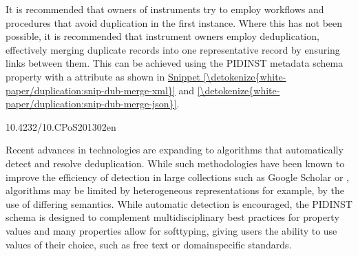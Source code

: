 \documentclass[a4paper,10pt,english]{sphinxmanual}
\begin{document}
\sphinxAtStartPar
It is recommended that owners of instruments try to employ workflows
and procedures that avoid duplication in the first instance.  Where
this has not been possible, it is recommended that instrument owners
employ deduplication, effectively merging duplicate records into one
representative record by ensuring links between them.  This can be
achieved using the PIDINST metadata schema 
property with a  attribute  as shown in
\hyperref[\detokenize{white-paper/duplication:snip-dub-merge-xml}]{Snippet \ref{\detokenize{white-paper/duplication:snip-dub-merge-xml}}} and \hyperref[\detokenize{white-paper/duplication:snip-dub-merge-json}]{\ref{\detokenize{white-paper/duplication:snip-dub-merge-json}}}.
\def\sphinxLiteralBlockLabel{\label{\detokenize{white-paper/duplication:snip-dub-merge-xml}}}
\begin{sphinxVerbatim}[commandchars=\\\{\}]
       10.4232/10.CPoS\PYGZhy{}2013\PYGZhy{}02en
\end{sphinxVerbatim}
\def\sphinxLiteralBlockLabel{\label{\detokenize{white-paper/duplication:snip-dub-merge-json}}}
\begin{sphinxVerbatim}[commandchars=\\\{\}]
\PYG{p}{[}
     
\PYG{p}{]}
\end{sphinxVerbatim}

\sphinxAtStartPar
Recent advances in technologies are expanding to algorithms that
automatically detect and resolve deduplication.  While such
methodologies have been known to improve the efficiency of detection
in large collections such as Google Scholar or ,
algorithms may be limited by heterogeneous representations for
example, by the use of differing semantics.  While automatic detection
is encouraged, the PIDINST schema is designed to complement
multidisciplinary best practices for property values and many
properties allow for soft\sphinxhyphen{}typing, giving users the ability to use
values of their choice, such as free text or domain\sphinxhyphen{}specific
standards.
\end{document}
